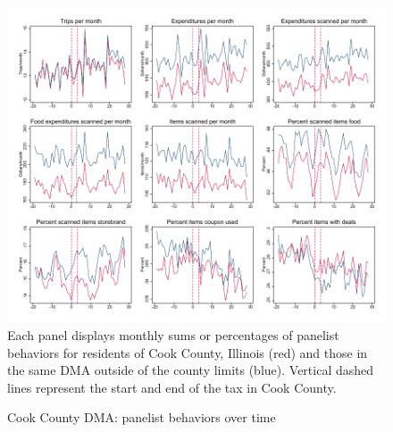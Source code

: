 \documentclass[12pt]{article}
\begin{document}
\clearpage


\clearpage


\clearpage



\clearpage
\begin{figure}[t]
\begin{center}
\caption{Cook County DMA: panelist behaviors over time}
\label{cook_panelist_behav}
\includegraphics[width=1\textwidth, angle=0]{../figures/panelist_behav.pdf}
\footnotesize Each panel displays monthly sums or percentages of panelist behaviors for residents of Cook County, Illinois (red) and those in the same DMA outside of the county limits (blue). Vertical dashed lines represent the start and end of the tax in Cook County.
\end{center}
\end{figure}
\end{document}
